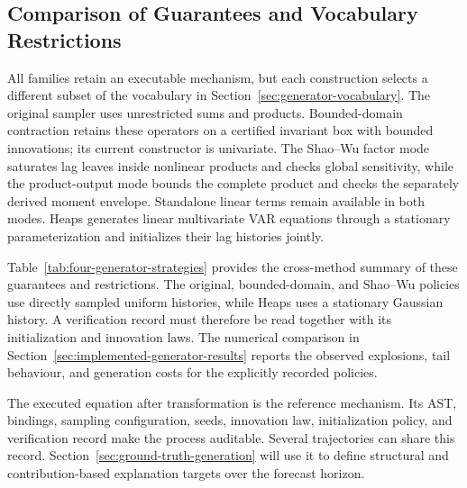 \subsection{Comparison of Guarantees and Vocabulary Restrictions}
\label{sec:generator-guarantee-comparison}

All families retain an executable mechanism, but each construction selects a
different subset of the vocabulary in Section~\ref{sec:generator-vocabulary}.
The original sampler uses unrestricted sums and products. Bounded-domain
contraction retains these operators on a certified invariant box with bounded
innovations; its current constructor is univariate. The Shao--Wu factor mode
saturates lag leaves inside nonlinear products and checks global sensitivity,
while the product-output mode bounds the complete product and checks the
separately derived moment envelope. Standalone linear terms remain available
in both modes. Heaps generates linear multivariate VAR equations through a
stationary parameterization and initializes their lag histories jointly.

Table~\ref{tab:four-generator-strategies} provides the cross-method summary of
these guarantees and restrictions. The original, bounded-domain, and
Shao--Wu policies use directly sampled uniform histories, while Heaps uses a
stationary Gaussian history. A verification record must therefore be read
together with its initialization and innovation laws. The numerical
comparison in Section~\ref{sec:implemented-generator-results} reports the
observed explosions, tail behaviour, and generation costs for the explicitly
recorded policies.

The executed equation after transformation is the reference mechanism.
Its AST, bindings, sampling configuration, seeds, innovation law,
initialization policy, and verification record make the process auditable.
Several trajectories can share this record. Section~\ref{sec:ground-truth-generation}
will use it to define structural and contribution-based explanation targets
over the forecast horizon.
